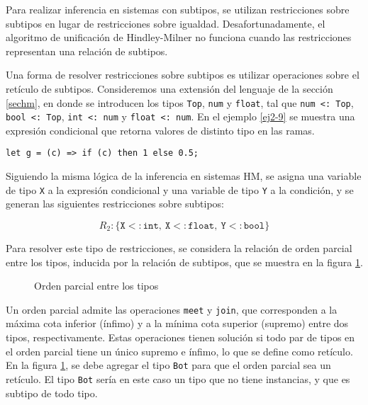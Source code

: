 Para realizar inferencia en sistemas con subtipos, se utilizan restricciones sobre subtipos en lugar de restricciones sobre igualdad. Desafortunadamente, el algoritmo de unificación de Hindley-Milner no funciona cuando las restricciones representan una relación de subtipos.

Una forma de resolver restricciones sobre subtipos es utilizar operaciones sobre el retículo de subtipos. Consideremos una extensión del lenguaje de la sección \ref{sechm}, en donde se introducen los tipos \texttt{Top}, \texttt{num} y \texttt{float}, tal que \texttt{num <: Top}, \texttt{bool <: Top}, \texttt{int <: num} y \texttt{float <: num}. En el ejemplo \ref{ej2-9} se muestra una expresión condicional que retorna valores de distinto tipo en las ramas.
\vspace{0.8em}
\begin{ej}
  \normalfont
  \label{ej2-9}
\begin{lstlisting}[morekeywords={then}]
  let g = (c) => if (c) then 1 else 0.5;
\end{lstlisting}
\end{ej}

Siguiendo la misma lógica de la inferencia en sistemas HM, se asigna una variable de tipo \texttt{X} a la expresión condicional y una variable de tipo \texttt{Y} a la condición, y se generan las siguientes restricciones sobre subtipos:

\[
R_2: \{ \mathtt{X <: int,\ X <: float,\ Y <: bool} \}
\]


Para resolver este tipo de restricciones, se considera la relación de orden parcial entre los tipos, inducida por la relación de subtipos, que se muestra en la figura \ref{subt1}.

\begin{figure}[ht]
  \centering
  \caption{Orden parcial entre los tipos}
  \label{subt1}
\end{figure}

Un orden parcial admite las operaciones \texttt{meet} y \texttt{join}, que corresponden a la máxima cota inferior (ínfimo) y a la mínima cota superior (supremo) entre dos tipos, respectivamente. Estas operaciones tienen solución si todo par de tipos en el orden parcial tiene un único supremo e ínfimo, lo que se define como retículo. En la figura \ref{subt1}, se debe agregar el tipo \texttt{Bot} para que el orden parcial sea un retículo. El tipo \texttt{Bot} sería en este caso un tipo que no tiene instancias, y que es subtipo de todo tipo.


